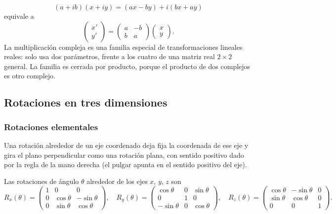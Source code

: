 \begin{idea}
\[
(a+ib)(x+iy)=(ax-by)+i(bx+ay)
\]
equivale a
\[
\begin{pmatrix}x'\\y'\end{pmatrix}
=
\begin{pmatrix}a&-b\\b&a\end{pmatrix}
\begin{pmatrix}x\\y\end{pmatrix}.
\]
La multiplicación compleja es una familia especial de transformaciones lineales reales:
solo usa dos parámetros, frente a los cuatro de una matriz real \(2\times2\) general. La
familia es cerrada por producto, porque el producto de dos complejos es otro complejo.
\end{idea}

\subsection{Rotaciones en tres dimensiones}\label{sec:rot-3d}

{\small\vspace{1mm}\par}


\subsubsection{Rotaciones elementales}

Una rotación alrededor de un eje coordenado deja fija la coordenada de ese eje y gira el
plano perpendicular como una rotación plana, con sentido positivo dado por la regla de la mano
derecha (el pulgar apunta en el sentido positivo del eje).

\begin{definicion}
Las rotaciones de ángulo \(\theta\) alrededor de los ejes \(x\), \(y\), \(z\) son
\[
R_x(\theta)=
\begin{pmatrix}
1&0&0\\0&\cos\theta&-\sin\theta\\0&\sin\theta&\cos\theta
\end{pmatrix},\quad
R_y(\theta)=
\begin{pmatrix}
\cos\theta&0&\sin\theta\\0&1&0\\-\sin\theta&0&\cos\theta
\end{pmatrix},\quad
R_z(\theta)=
\begin{pmatrix}
\cos\theta&-\sin\theta&0\\
\sin\theta& \cos\theta&0\\
0&0&1
\end{pmatrix}.
\]
\end{definicion}

